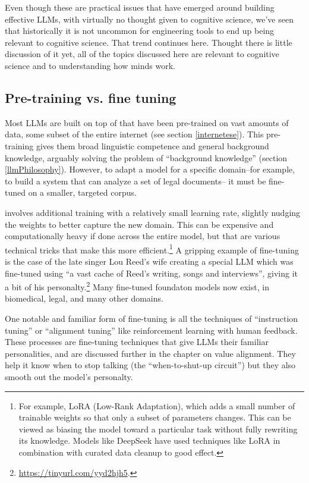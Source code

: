 Even though these are practical issues that have emerged around building effective LLMs, with virtually no thought given to cognitive science, we've seen that historically it is not uncommon for engineering tools to end up being relevant to cognitive science. That trend continues here. Thought there is little discussion of it yet, all of the topics discussed here are relevant to cognitive science and to understanding how minds work. 

\subsection{Pre-training vs. fine tuning} 

Most LLMs are built on top of  that have been pre-trained on vast amounts of data, some subset of the entire internet (see section \ref{internetese}). This pre-training gives them broad linguistic competence and general background knowledge, arguably solving the problem of  ``background knowledge'' (section \ref{llmPhilosophy}).  However, to adapt a model for a specific domain--for example, to build a system that can analyze a set of legal documents-- it must be fine-tuned on a smaller, targeted corpus.

  involves additional training with a relatively small learning rate, slightly nudging the weights to better capture the new domain. This can be expensive and computationally heavy if done across the entire model, but that are various technical tricks that make this more efficient.\footnote{For example, LoRA (Low-Rank Adaptation), which adds a small number of trainable weights so that only a subset of parameters changes. This can be viewed as biasing the model toward a particular task without fully rewriting its knowledge. Models like DeepSeek have used techniques like LoRA in combination with curated data cleanup to good effect.} A gripping example of fine-tuning is the case of the late singer Lou Reed's wife creating a special LLM which was fine-tuned using ``a vast cache of Reed’s writing, songs and interviews'', giving it a bit of his personalty.\footnote{\url{https://tinyurl.com/yyd2hjh5}.}  Many fine-tuned foundaton models now exist, in biomedical, legal, and many other domains.
 
 One notable and familiar form of fine-tuning is all the techniques of ``instruction tuning'' or ``alignment tuning'' like reinforcement learning with human feedback.  These processes are fine-tuning techniques that give LLMs their familiar personalities, and are discussed further in the chapter on value alignment. They help it know when to stop talking (the ``when-to-shut-up circuit'') but they also smooth out the model's personalty. 


